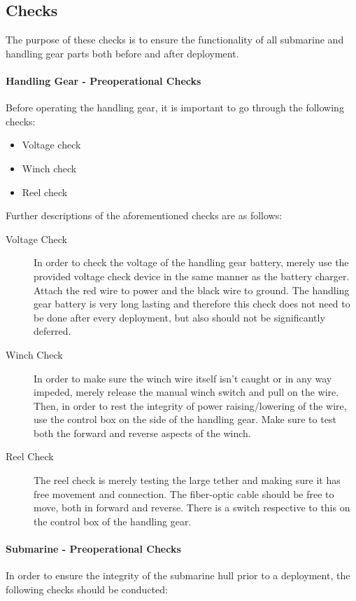 \documentclass[
18pt, %
a4paper, %
oneside, %
headinclude,footinclude, %
]{scrartcl}
\begin{document}
\subsection{Checks}

The purpose of these checks is to ensure the functionality of all submarine and handling gear parts both before and after deployment.

\paragraph{Handling Gear - Preoperational Checks} Before operating the handling gear, it is important to go through the following checks:

\begin{itemize}[noitemsep] %
	\item Voltage check
	\item Winch check
	\item Reel check
	
\end{itemize}
Further descriptions of the aforementioned checks are as follows:

\begin{description}
	\item[Voltage Check] In order to check the voltage of the handling gear battery, merely use the provided voltage check device in the same manner as the battery charger. Attach the red wire to power and the black wire to ground. The handling gear battery is very long lasting and therefore this check does not need to be done after every deployment, but also should not be significantly deferred.
	\item[Winch Check] In order to make sure the winch wire itself isn't caught or in any way impeded, merely release the manual winch switch and pull on the wire. Then, in order to rest the integrity of power raising/lowering of the wire, use the control box on the side of the handling gear. Make sure to test both the forward and reverse aspects of the winch. 
	\item[Reel Check] The reel check is merely testing the large tether and making sure it has free movement and connection. The fiber-optic cable should be free to move, both in forward and reverse. There is a switch respective to this on the control box of the handling gear.
\end{description}

\paragraph{Submarine - Preoperational Checks} In order to ensure the integrity of the submarine hull prior to a deployment, the following checks should be conducted:
\end{document}
